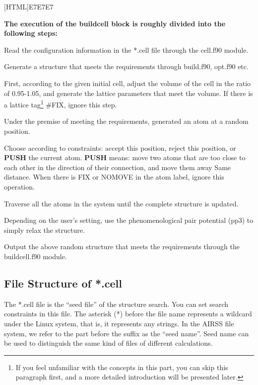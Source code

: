 \documentclass[a4paper, 10pt]{article}
\begin{document}
\noindent{}[HTML]{E7E7E7}{\parbox{\textwidth}{%
\noindent \textbf{The execution of the buildcell block is roughly divided into the following steps:}
\begin{maineu}
\item Read the configuration information in the *.cell file through the cell.f90 module.
\item Generate a structure that meets the requirements through build.f90, opt.f90 etc.
  \begin{subeu}
    \item First, according to the given initial cell, adjust the volume of the cell in the ratio of 0.95-1.05, and generate the lattice parameters that meet the volume. If there is a lattice tag\footnote{If you feel unfamiliar with the concepts in this part, you can skip this paragraph first, and a more detailed introduction will be presented later.} \#FIX, ignore this step.
    \item Under the premise of meeting the requirements, generated an atom at a random position.
    \item Choose according to constraints: accept this position, reject this position, or \textbf{PUSH} the current atom. \textbf{PUSH} means: move two atoms that are too close to each other in the direction of their connection, and move them away Same distance. When there is FIX or NOMOVE in the atom label, ignore this operation.
    \item Traverse all the atoms in the system until the complete structure is updated.
    \item Depending on the user's setting, use the phenomenological pair potential (pp3) to simply relax the structure.
  \end{subeu}
\item Output the above random structure that meets the requirements through the buildcell.f90 module.
\end{maineu}}}

\subsection{File Structure of *.cell}

The *.cell file is the ``seed file'' of the structure search. You can set search constraints in this file. The asterisk (*) before the file name represents a wildcard under the Linux system, that is, it represents any strings. In the AIRSS file system, we refer to the part before the suffix as the ``seed name''. Seed name can be used to distinguish the same kind of files of different calculations.
\end{document}
